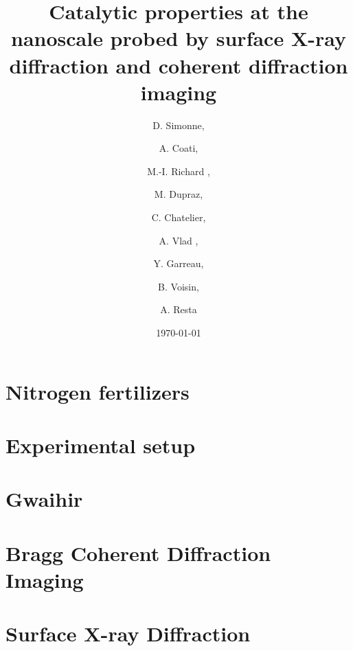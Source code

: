 \documentclass[xcolor=table, t, 9pt, head=0cm]{beamer}
\title[Main Title]
{   
    Catalytic properties at the nanoscale probed by surface X-ray diffraction and coherent diffraction imaging
}
\author
{D. Simonne\inst{1, 2},\and A. Coati\inst{1},\and M.-I. Richard \inst{2, 3},\and M. Dupraz\inst{2, 3},\and C. Chatelier\inst{2, 3},\and A. Vlad \inst{1},\and Y. Garreau\inst{1},\and B. Voisin\inst{1},\and A. Resta\inst{1}}
\institute
{
  \inst{1}
  Synchrotron SOLEIL
 \and
  \inst{2}
  Commissariat à l’énergie atomique et aux énergies alternatives – CEA Grenoble
 \and
  \inst{3}
 ESRF -- The European Synchrotron 
}
\date{\footnotesize{\today}}
\begin{document}
	\begin{frame}[plain]
		\titlepage
	\end{frame}

    \section{Nitrogen fertilizers}
    
    
    

    
	\section{Experimental setup}
    
    
    
    
    

    \section{Gwaihir}
        
    

    \section{Bragg Coherent Diffraction Imaging}
    
    

    \section{Surface X-ray Diffraction}
    
    
    
    
    
    
    
    
    
\end{document}
